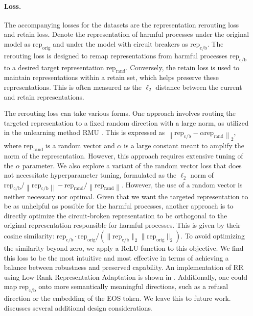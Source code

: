 \paragraph{Loss.}
The accompanying losses for the datasets are the representation rerouting loss and retain loss. Denote the representation of harmful processes under the original model as \( \text{rep}_\text{orig} \) and under the model with circuit breakers as \( \text{rep}_\text{c/b} \). The rerouting loss is designed to remap representations from harmful processes \( \text{rep}_\text{c/b} \) to a desired target representation \( \text{rep}_\text{rand} \). Conversely, the retain loss is used to maintain representations within a retain set, which helps preserve these representations. This is often measured as the $\ell_2$ distance between the current and retain representations.

The rerouting loss can take various forms. One approach involves routing the targeted representation to a fixed random direction with a large norm, as utilized in the unlearning method RMU \citep{li2024wmdp}. This is expressed as \( \left\| \text{rep}_\text{c/b} - \alpha \text{rep}_\text{rand} \right\|_2 \), where \( \text{rep}_\text{rand} \) is a random vector and \( \alpha \) is a large constant meant to amplify the norm of the representation. However, this approach requires extensive tuning of the \( \alpha \) parameter. We also explore a variant of the random vector loss that does not necessitate hyperparameter tuning, formulated as the $\ell_2$ norm of \( \text{rep}_\text{c/b} / \left\| \text{rep}_\text{c/b} \right\| - \text{rep}_\text{rand} / \left\| \text{rep}_\text{rand} \right\| \). However, the use of a random vector is neither necessary nor optimal. Given that we want the targeted representation to be as unhelpful as possible for the harmful processes, another approach is to directly optimize the circuit-broken representation to be orthogonal to the original representation responsible for harmful processes. This is given by their cosine similarity: \( \text{rep}_\text{c/b} \cdot \text{rep}_\text{orig} / (\| \text{rep}_\text{c/b} \|_2 \| \text{rep}_\text{orig} \|_2) \). To avoid optimizing the similarity beyond zero, we apply a ReLU function to this objective. We find this loss to be the most intuitive and most effective in terms of achieving a balance between robustness and preserved capability. An implementation of RR using Low-Rank Representation Adaptation is shown in . Additionally, one could map \( \text{rep}_\text{c/b} \) onto more semantically meaningful directions, such as a refusal direction or the embedding of the EOS token. We leave this to future work.  discusses several additional design considerations.
